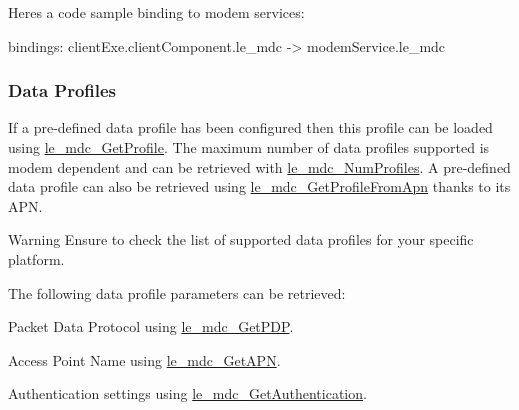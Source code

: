 Here\textquotesingle{}s a code sample binding to modem services\+: \begin{DoxyVerb}bindings:
{
   clientExe.clientComponent.le_mdc -> modemService.le_mdc
}
\end{DoxyVerb}
\hypertarget{c_mdc_le_mdc_profile}{}\subsubsection{Data Profiles}\label{c_mdc_le_mdc_profile}
If a pre-\/defined data profile has been configured then this profile can be loaded using \hyperlink{le__mdc__interface_8h_a638b693cd5f644fa5c24f81e1e36483c}{le\+\_\+mdc\+\_\+\+Get\+Profile}. The maximum number of data profiles supported is modem dependent and can be retrieved with \hyperlink{le__mdc__interface_8h_a790602f1b17d7bf9626a51eac5599439}{le\+\_\+mdc\+\_\+\+Num\+Profiles}. A pre-\/defined data profile can also be retrieved using \hyperlink{le__mdc__interface_8h_a160de65c9260e93f7fc2140c0ff429e7}{le\+\_\+mdc\+\_\+\+Get\+Profile\+From\+Apn} thanks to its A\+P\+N.

\begin{DoxyWarning}{Warning}
Ensure to check the list of supported data profiles for your specific platform.
\end{DoxyWarning}
The following data profile parameters can be retrieved\+:
\begin{DoxyItemize}
\item Packet Data Protocol using \hyperlink{le__mdc__interface_8h_a0a51125579f1d5009dac03c79ddff498}{le\+\_\+mdc\+\_\+\+Get\+P\+D\+P}.
\item Access Point Name using \hyperlink{le__mdc__interface_8h_ac9accd1ea303d6840e5e7de19b0dae6f}{le\+\_\+mdc\+\_\+\+Get\+A\+P\+N}.
\item Authentication settings using \hyperlink{le__mdc__interface_8h_a2bd23fc2f951772a8fa73301affff36f}{le\+\_\+mdc\+\_\+\+Get\+Authentication}.
\end{DoxyItemize}

